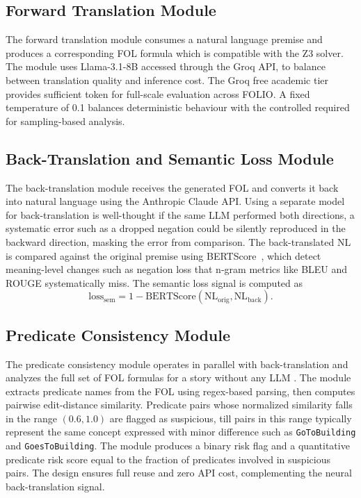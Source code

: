 \subsection{Forward Translation Module}

The forward translation module consumes a natural language premise and produces a corresponding FOL formula which is compatible with the Z3 solver. The module uses Llama-3.1-8B accessed through the Groq API, to balance between translation quality and inference cost. The Groq free academic tier provides sufficient token for full-scale evaluation across FOLIO. A fixed temperature of 0.1 balances deterministic behaviour with the controlled required for sampling-based analysis.

\subsection{Back-Translation and Semantic Loss Module}

The back-translation module receives the generated FOL and converts it back into natural language using the Anthropic Claude API. Using a separate model for back-translation is well-thought if the same LLM performed both directions, a systematic error such as a dropped negation could be silently reproduced in the backward direction, masking the error from comparison. The back-translated NL is compared against the original premise using BERTScore~\cite{zhang2020bertscore}, which detect meaning-level changes such as negation loss that n-gram metrics like BLEU and ROUGE systematically miss. The semantic loss signal is computed as
\[
\text{loss}_{\text{sem}} = 1 - \text{BERTScore}(\text{NL}_{\text{orig}}, \text{NL}_{\text{back}}).
\]

\subsection{Predicate Consistency Module}

The predicate consistency module operates in parallel with back-translation and analyzes the full set of FOL formulas for a story without any LLM . The module extracts predicate names from the FOL using regex-based parsing, then computes pairwise edit-distance similarity. Predicate pairs whose normalized similarity falls in the range $(0.6, 1.0)$ are flagged as suspicious, till pairs in this range typically represent the same concept expressed with minor difference such as \texttt{GoToBuilding} and \texttt{GoesToBuilding}. The module produces a binary risk flag and a quantitative predicate risk score equal to the fraction of predicates involved in suspicious pairs. The design ensures full reuse and zero API cost, complementing the neural back-translation signal.

